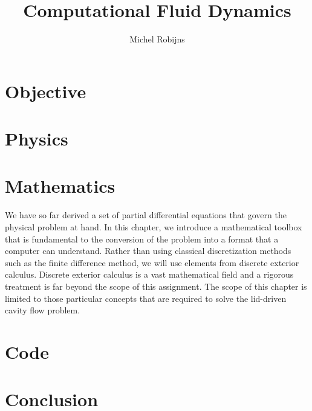 \documentclass[a4paper,10pt]{scrreprt}
\begin{document}
\title{Computational Fluid Dynamics}
\author{Michel Robijns}

\maketitle

\tableofcontents

\chapter{Objective}



\chapter{Physics}
\label{cha:physics}



\chapter{Mathematics}
\label{cha:mathematics}

We have so far derived a set of partial differential equations that govern the physical problem at hand. In this chapter, we introduce a mathematical toolbox that is fundamental to the conversion of the problem into a format that a computer can understand. Rather than using classical discretization methods such as the finite difference method, we will use elements from discrete exterior calculus. Discrete exterior calculus is a vast mathematical field and a rigorous treatment is far beyond the scope of this assignment. The scope of this chapter is limited to those particular concepts that are required to solve the lid-driven cavity flow problem.









\chapter{Code}

\chapter{Conclusion}
\end{document}
